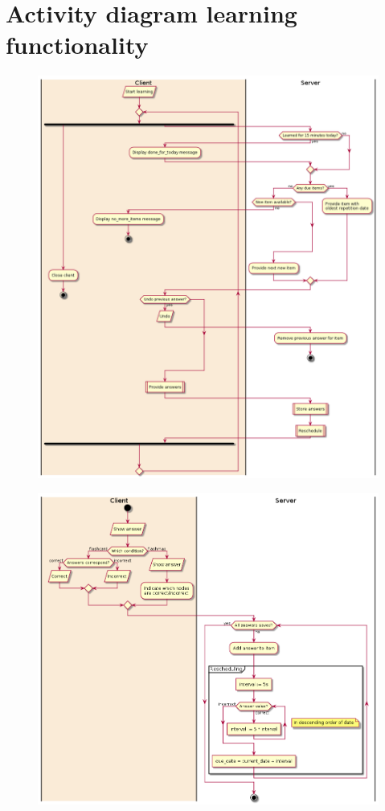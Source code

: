 \section{Activity diagram learning functionality}
\label{app:learningactivity}
\begin{figure}[h!]
\centering
\includegraphics[width=\textwidth]{img/learningactivitygen.png}
\end{figure}
\begin{figure}[h!]
\centering
\includegraphics[width=\textwidth]{img/learningactivitydet.png}
\end{figure}
